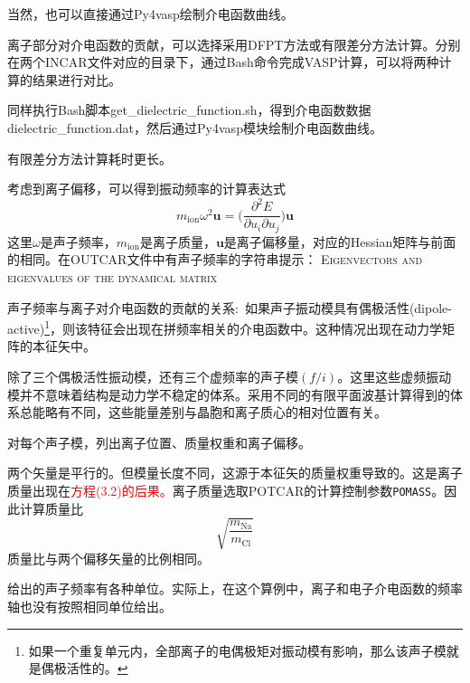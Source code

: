 当然，也可以直接通过\textrm{Py4vasp}绘制介电函数曲线。

离子部分对介电函数的贡献，可以选择采用\textrm{DFPT}方法或有限差分方法计算。分别在两个\textrm{INCAR}文件对应的目录下，通过\textrm{Bash}命令完成\textrm{VASP}计算，可以将两种计算的结果进行对比。

同样执行\textrm{Bash}脚本\textrm{get\_dielectric\_function.sh}，得到介电函数数据\textrm{dielectric\_function.dat}，然后通过\textrm{Py4vasp}模块绘制介电函数曲线。

有限差分方法计算耗时更长。

考虑到离子偏移，可以得到振动频率的计算表达式
\begin{displaymath}
	m_{\mathrm{ion}}\omega^2\mathbf{u}=\bigg(\dfrac{\partial^2E}{\partial u_i\partial u_j}\bigg)\mathbf{u}
\end{displaymath}
这里$\omega$是声子频率，$m_{\mathrm{ion}}$是离子质量，$\mathbf{u}$是离子偏移量，对应的\textrm{Hessian}矩阵与前面的相同。在\textrm{OUTCAR}文件中有声子频率的字符串提示：
\textsc{Eigenvectors and eigenvalues of the dynamical matrix}

声子频率与离子对介电函数的贡献的关系:~如果声子振动模具有偶极活性\textrm{(dipole-active)}\footnote{如果一个重复单元内，全部离子的电偶极矩对振动模有影响，那么该声子模就是偶极活性的。}，则该特征会出现在拼频率相关的介电函数中。这种情况出现在动力学矩阵的本征矢中。

除了三个偶极活性振动模，还有三个虚频率的声子模$(f/i)$。这里这些虚频振动模并不意味着结构是动力学不稳定的体系。采用不同的有限平面波基计算得到的体系总能略有不同，这些能量差别与晶胞和离子质心的相对位置有关。

对每个声子模，列出离子位置、质量权重和离子偏移。

两个矢量是平行的。但模量长度不同，这源于本征矢的质量权重导致的。这是离子质量出现在\textcolor{red}{方程(3.2)的后果。}离子质量选取\textrm{POTCAR}的计算控制参数\texttt{POMASS}。因此计算质量比
\begin{displaymath}
	\sqrt{\dfrac{m_{\mathrm{Na}}}{m_{\mathrm{Cl}}}}
\end{displaymath}
质量比与两个偏移矢量的比例相同。

给出的声子频率有各种单位。实际上，在这个算例中，离子和电子介电函数的频率轴也没有按照相同单位给出。

